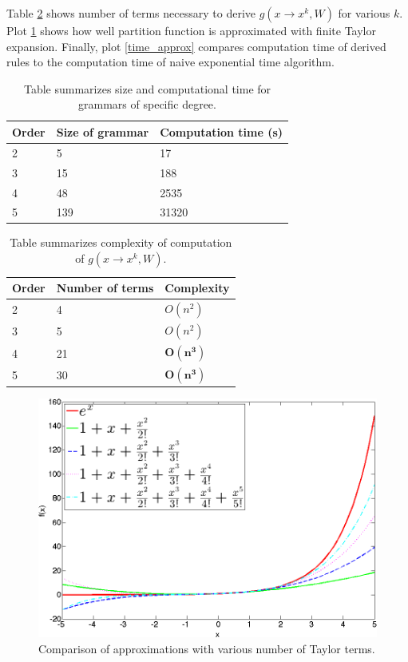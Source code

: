 \documentclass{article}
\begin{document}
Table \ref{eval} shows number of terms necessary to derive $g(x \rightarrow x^k, W)$ for various $k$. Plot \ref{approximations} shows 
how well partition function is approximated with finite Taylor expansion. Finally, plot \ref{time_approx} 
compares computation time of derived rules to the computation time of naive exponential time algorithm.

\begin{table}
\tiny
\centering
\begin{tabular}{|l||l|l|}
\hline\hline
Order & Size of grammar & Computation time (s) \\
\hline\hline
2 & 5 & 17 \\
3 & 15 & 188 \\
4 & 48 & 2535\\
5 & 139 & 31320 \\
\hline
\end{tabular}
\caption{Table summarizes size and computational time for grammars of specific degree.}
\label{grammars}
\end{table}

\begin{table}
\tiny
\centering
\begin{tabular}{|l|l|l|}
\hline\hline
Order & Number of terms & Complexity \\
\hline\hline
2 & 4 & $O(n^2)$\\
3 & 5 & $O(n^2)$\\
4 & 21 & $\mathbf{O(n^3)}$\\
5 & 30 & $\mathbf{O(n^3)}$\\
\hline
\end{tabular}
\caption{Table summarizes complexity of computation of $g(x \rightarrow x^k, W)$.} 
\label{eval}
\end{table}

\begin{figure}[h]
\centering
\includegraphics[scale=0.2]{img/approximations.png}
\caption{Comparison of approximations with various number of Taylor terms.}
\label{approximations}
\end{figure}
\end{document}
